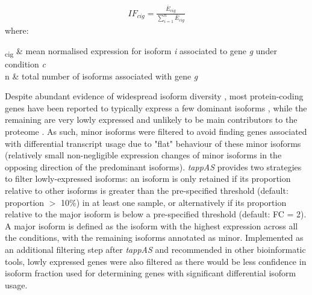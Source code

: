 \begin{myequation}[!h]
	\label{eqn:tappas_IF}
	\begin{align}
		IF_{cig} = \frac{\bar{E}_{cig}}{\sum_{i=1}^{n}\bar{E}_{cig}}
	\end{align}
	where:
	\begin{conditions*}
		\hspace{3mm}\textsubscript{cig} & mean normalised expression for isoform \textit{i} associated to gene \textit{g} under condition \textit{c}\\
		\hspace{3mm}n  & total number of isoforms associated with gene \textit{g}
	\end{conditions*}
\end{myequation}

Despite abundant evidence of widespread isoform diversity \cite{Wang2008}, most protein-coding genes have been reported to typically express a few dominant isoforms \cite{Gonzalez-Porta2013, Ezkurdia2015}, while the remaining are very lowly expressed and unlikely to be main contributors to the proteome \cite{Gonzalez-Porta2013}. As such, minor isoforms were filtered to avoid finding genes associated with differential transcript usage due to "flat" behaviour of these minor isoforms \cite{DeLaFuente2020} (relatively small non-negligible expression changes of minor isoforms in the opposing direction of the predominant isoforms). \textit{tappAS} provides two strategies to filter lowly-expressed isoforms: an isoform is only retained if its proportion relative to other isoforms is greater than the pre-specified threshold (default: proportion $>$ 10\%) in at least one sample, or alternatively if its proportion relative to the major isoform is below a pre-specified threshold (default: FC = 2). A major isoform is defined as the isoform with the highest expression across all the conditions, with the remaining isoforms annotated as minor. Implemented as an additional filtering step after \textit{tappAS} and recommended in other bioinformatic tools\cite{Vitting-Seerup2017}, lowly expressed genes were also filtered as there would be less confidence in isoform fraction used for determining genes with significant differential isoform usage.   